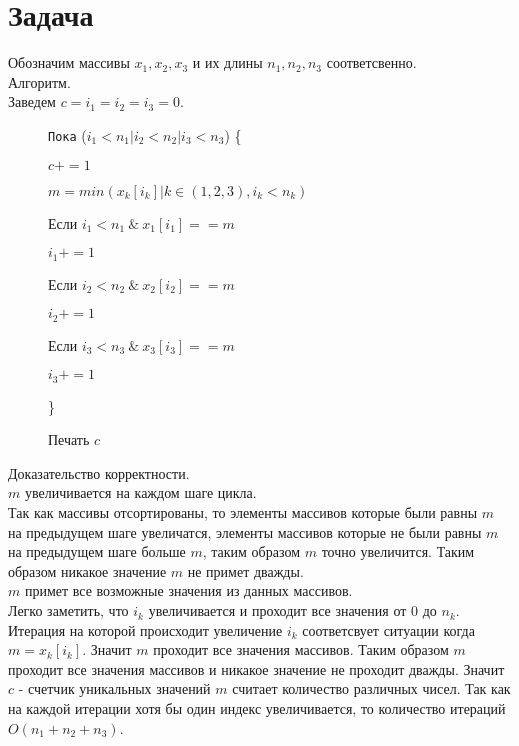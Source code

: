 \documentclass[12pt]{exam}
\begin{document}
\section*{Задача}
Обозначим массивы $x_1, x_2, x_3$ и их длины $n_1, n_2, n_3$ соответсвенно.\\

Алгоритм.\\
Заведем $c = i_1 = i_2 = i_3 = 0$.
\begin{figure}[h]
    {\tt Пока} ($i_1 < n_1 | i_2 < n_2 | i_3 < n_3$) \{ 

        \hspace{4mm} {\tt} $c += 1$

        \hspace{4mm} {\tt} $m = min(x_k[i_k]| k \in (1, 2, 3), i_k < n_k )$ 

        \hspace{4mm} {\tt} Если $i_1 < n_1 \:\&\: x_1[i_1] == m$ 

        \hspace{8mm} {\tt} $i_1 += 1$

        \hspace{4mm} {\tt} Если $i_2 < n_2 \:\&\: x_2[i_2] == m$

        \hspace{8mm} {\tt} $i_2 += 1$

        \hspace{4mm} {\tt} Если $i_3 < n_3 \:\&\: x_3[i_3] == m$

        \hspace{8mm} {\tt} $i_3 += 1$

        \hspace{4mm} 

    \} 

    Печать $c$
\end{figure}

Доказательство корректности.\\
$m$ увеличивается на каждом шаге цикла.\\
Так как массивы отсортированы, то элементы массивов которые были равны $m$ на предыдущем шаге увеличатся, 
элементы массивов которые не были равны $m$ на предыдущем шаге больше $m$, таким образом $m$ точно увеличится. 
Таким образом никакое значение $m$ не примет дважды.\\
$m$ примет все возможные значения из данных массивов.\\
Легко заметить, что $i_k$ увеличивается и проходит все значения от $0$ до $n_k$. 
Итерация на которой происходит увеличение $i_k$ соответсвует ситуации когда $m=x_k[i_k]$. 
Значит $m$ проходит все значения массивов.
Таким образом $m$ проходит все значения массивов и никакое значение не проходит дважды. 
Значит $c$ - счетчик уникальных значений $m$ считает количество различных чисел.
Так как на каждой итерации хотя бы один индекс увеличивается, то количество итераций $O(n_1 + n_2 + n_3)$.
\end{document}

